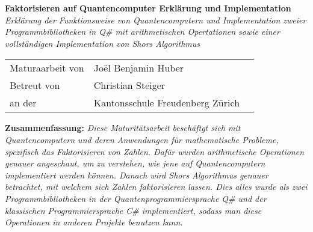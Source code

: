 \begin{titlepage}
    \centering
    {\huge \textbf{Faktorisieren auf Quantencomputer \newline Erklärung und Implementation}}
    \vspace{1cm}
    \newline
    {\LARGE\textit{Erklärung der Funktionsweise von Quantencomputern und Implementation zweier Programmbibliotheken in Q\# mit arithmetischen Opertationen sowie einer vollständigen Implementation von Shors Algorithmus}}
    \vspace{1cm}
    \newline
    {\Large \begin{tabular}{l@{}ll}
        Maturaarbeit von \; \; &  Joël Benjamin Huber & \\
        Betreut von & Christian Steiger & \\
        an der & Kantonsschule Freudenberg Zürich & \\
    \end{tabular}
    }
    \vspace{3cm}
    \newline
    {

        \textbf{Zusammenfassung: } \textit{Diese Maturitätsarbeit beschäftgt sich mit Quantencomputern und deren Anwendungen für mathematische Probleme, spezifisch das Faktorisieren von Zahlen. Dafür wurden arithmetische Operationen genauer angeschaut, um zu verstehen, wie jene auf Quantencomputern implementiert werden können. Danach wird Shors Algorithmus genauer betrachtet, mit welchem sich Zahlen faktorisieren lassen. Dies alles wurde als zwei Programmbibliotheken in der Quantenprogrammiersprache Q\# und der klassischen Programmiersprache C\# implementiert, sodass man diese Operationen in anderen Projekte benutzen kann. }
    }
\end{titlepage}